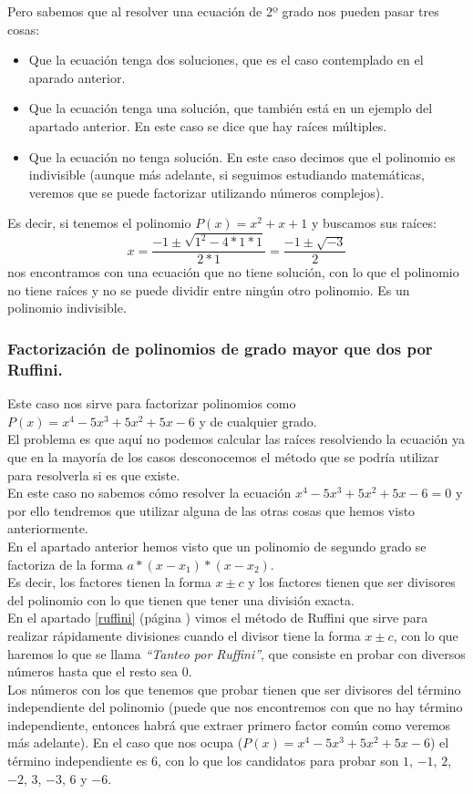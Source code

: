 \documentclass[a4paper,11pt,answers]{exam}
\begin{document}
Pero sabemos que al resolver una ecuación de 2º grado nos pueden pasar tres cosas:
\begin{itemize}
\item Que la ecuación tenga dos soluciones, que es el caso contemplado en el aparado anterior.
\item Que la ecuación tenga una solución, que también está en un ejemplo del apartado anterior. En este caso se dice que hay raíces múltiples.
\item Que la ecuación no tenga solución. En este caso decimos que el polinomio es indivisible (aunque más adelante, si seguimos estudiando matemáticas, veremos que se puede factorizar utilizando números complejos).
\end{itemize}


Es decir, si tenemos el polinomio $P(x) = x^2 + x + 1$ y buscamos sus raíces:
\[x = \frac{-1 \pm \sqrt{1^2 - 4*1*1}}{2*1} = \frac{-1 \pm \sqrt{-3}}{2}\]
nos encontramos con una ecuación que no tiene solución, con lo que el polinomio no tiene raíces y no se puede dividir entre ningún otro polinomio. Es un polinomio indivisible.

\subsubsection{Factorización de polinomios de grado mayor que dos por Ruffini.} \label{ruffini_general}
Este caso nos sirve para factorizar polinomios como $P(x) = x^4 - 5x^3 + 5x^2 + 5x -6$ y de cualquier grado.\\
El problema es que aquí no podemos calcular las raíces resolviendo la ecuación ya que en la mayoría de los casos desconocemos el método que se podría utilizar para resolverla si es que existe.\\
En este caso no sabemos cómo resolver la ecuación $x^4 - 5x^3 + 5x^2 + 5x -6 = 0$ y por ello tendremos que utilizar alguna de las otras cosas que hemos visto anteriormente.\\

En el apartado anterior hemos visto que un polinomio de segundo grado se factoriza de la forma $a*(x-x_1)*(x-x_2)$.\\
Es decir, los factores tienen la forma $x\pm c$ y los factores tienen que ser divisores del polinomio con lo que tienen que tener una división exacta.\\

En el apartado \ref{ruffini} (página \pageref{ruffini}) vimos el método de Ruffini que sirve para realizar rápidamente divisiones cuando el divisor tiene la forma $x\pm c$, con lo que haremos lo que se llama \emph{``Tanteo por Ruffini''}, que consiste en probar con diversos números hasta que el resto sea 0.\\
Los números con los que tenemos que probar tienen que ser divisores del término independiente del polinomio (puede que nos encontremos con que no hay término independiente, entonces habrá que extraer primero factor común como veremos más adelante). En el caso que nos ocupa ($P(x) = x^4 - 5x^3 + 5x^2 + 5x -6$) el término independiente es $6$, con lo que los candidatos para probar son $1$, $-1$, $2$, $-2$, $3$, $-3$, $6$ y $-6$.\\
\end{document}
